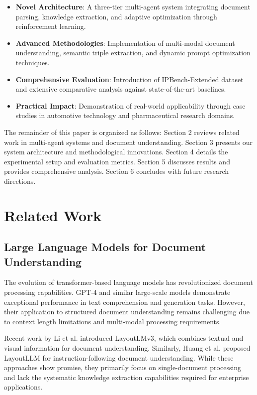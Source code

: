 \documentclass[11pt,a4paper]{article}
\begin{document}
\begin{itemize}
  \item \textbf{Novel Architecture}: A three-tier multi-agent system integrating document parsing, knowledge extraction, and adaptive optimization through reinforcement learning.
  
  \item \textbf{Advanced Methodologies}: Implementation of multi-modal document understanding, semantic triple extraction, and dynamic prompt optimization techniques.
  
  \item \textbf{Comprehensive Evaluation}: Introduction of IPBench-Extended dataset and extensive comparative analysis against state-of-the-art baselines.
  
  \item \textbf{Practical Impact}: Demonstration of real-world applicability through case studies in automotive technology and pharmaceutical research domains.
\end{itemize}

The remainder of this paper is organized as follows: Section 2 reviews related work in multi-agent systems and document understanding. Section 3 presents our system architecture and methodological innovations. Section 4 details the experimental setup and evaluation metrics. Section 5 discusses results and provides comprehensive analysis. Section 6 concludes with future research directions.

\section{Related Work}

\subsection{Large Language Models for Document Understanding}

The evolution of transformer-based language models has revolutionized document processing capabilities. GPT-4 \citep{openai2023gpt4} and similar large-scale models demonstrate exceptional performance in text comprehension and generation tasks. However, their application to structured document understanding remains challenging due to context length limitations and multi-modal processing requirements.

Recent work by Li et al. \citep{li2024layoutlmv3} introduced LayoutLMv3, which combines textual and visual information for document understanding. Similarly, Huang et al. \citep{huang2024layoutllm} proposed LayoutLLM for instruction-following document understanding. While these approaches show promise, they primarily focus on single-document processing and lack the systematic knowledge extraction capabilities required for enterprise applications.
\end{document}
